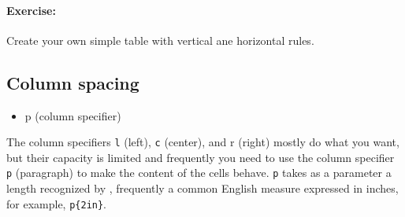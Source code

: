         \paragraph{Exercise:} Create your own simple table with vertical ane horizontal rules.

        \subsection{Column spacing}
        \label{Column spacing}
        
        \begin{framed}
            \begin{itemize}
                \item{p (column specifier)}
            \end{itemize}
        \end{framed}

        The column specifiers \texttt{l} (left), \texttt{c} (center), and \texttt{}r (right) mostly do what you want, but their capacity is limited and frequently you need to use the column specifier \texttt{p} (paragraph) to make the content of the cells behave. \texttt{p} takes as a parameter a length recognized by \Lx{}, frequently a common English measure expressed in inches, for example, \texttt{p\{2in\}}.

